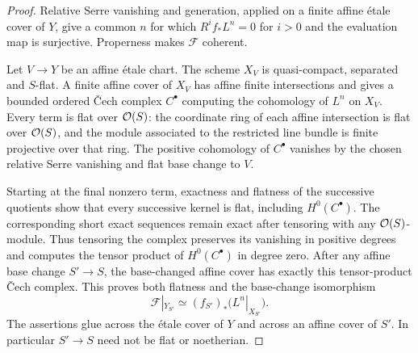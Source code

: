 \begin{proof}
Relative Serre vanishing and generation, applied on a finite affine
\textup{\'etale} cover of $Y$, give a common $n$ for which
$R^if_*L^n=0$ for $i>0$ and the evaluation map is surjective.
Properness makes $\mathcal F$ coherent.

Let $V\to Y$ be an affine \textup{\'etale} chart. The scheme $X_V$
is quasi-compact, separated and $S$-flat. A finite affine cover of
$X_V$ has affine finite intersections and gives a bounded ordered
\v Cech complex $C^\bullet$ computing the cohomology of $L^n$ on
$X_V$. Every term is flat over $\mathcal O(S)$: the coordinate ring of each
affine intersection is flat over $\mathcal O(S)$, and the module associated
to the restricted line bundle is finite projective over that ring.
The positive cohomology of $C^\bullet$ vanishes by the chosen
relative Serre vanishing and flat base change to $V$.

Starting at the final nonzero term, exactness and flatness of the
successive quotients show that every successive kernel is flat,
including $H^0(C^\bullet)$. The corresponding short exact sequences
remain exact after tensoring with any $\mathcal O(S)$-module. Thus tensoring
the complex preserves its vanishing in positive degrees and computes
the tensor product of $H^0(C^\bullet)$ in degree zero.
After any affine base change $S'\to S$, the base-changed affine cover
has exactly this tensor-product \v Cech complex. This proves both
flatness and the base-change isomorphism
\[
 \mathcal F|_{Y_{S'}}\simeq
 (f_{S'})_*\bigl(L^n|_{X_{S'}}\bigr).
\]
The assertions glue across the \textup{\'etale} cover of $Y$ and
across an affine cover of $S'$. In particular $S'\to S$ need not be
flat or noetherian.
\end{proof}

